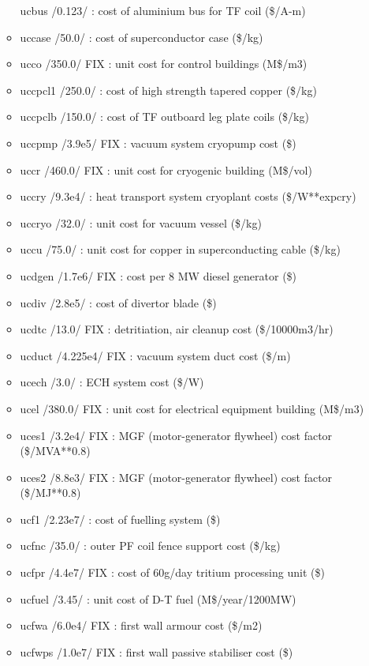 \documentclass[
]{article}
\begin{document}
\begin{itemize}
\begin{itemize}
    ucbus /0.123/ : cost of aluminium bus for TF coil (\$/A-m)
  \item
    uccase /50.0/ : cost of superconductor case (\$/kg)
  \item
    ucco /350.0/ FIX : unit cost for control buildings (M\$/m3)
  \item
    uccpcl1 /250.0/ : cost of high strength tapered copper (\$/kg)
  \item
    uccpclb /150.0/ : cost of TF outboard leg plate coils (\$/kg)
  \item
    uccpmp /3.9e5/ FIX : vacuum system cryopump cost (\$)
  \item
    uccr /460.0/ FIX : unit cost for cryogenic building (M\$/vol)
  \item
    uccry /9.3e4/ : heat transport system cryoplant costs (\$/W**expcry)
  \item
    uccryo /32.0/ : unit cost for vacuum vessel (\$/kg)
  \item
    uccu /75.0/ : unit cost for copper in superconducting cable (\$/kg)
  \item
    ucdgen /1.7e6/ FIX : cost per 8 MW diesel generator (\$)
  \item
    ucdiv /2.8e5/ : cost of divertor blade (\$)
  \item
    ucdtc /13.0/ FIX : detritiation, air cleanup cost (\$/10000m3/hr)
  \item
    ucduct /4.225e4/ FIX : vacuum system duct cost (\$/m)
  \item
    ucech /3.0/ : ECH system cost (\$/W)
  \item
    ucel /380.0/ FIX : unit cost for electrical equipment building
    (M\$/m3)
  \item
    uces1 /3.2e4/ FIX : MGF (motor-generator flywheel) cost factor
    (\$/MVA**0.8)
  \item
    uces2 /8.8e3/ FIX : MGF (motor-generator flywheel) cost factor
    (\$/MJ**0.8)
  \item
    ucf1 /2.23e7/ : cost of fuelling system (\$)
  \item
    ucfnc /35.0/ : outer PF coil fence support cost (\$/kg)
  \item
    ucfpr /4.4e7/ FIX : cost of 60g/day tritium processing unit (\$)
  \item
    ucfuel /3.45/ : unit cost of D-T fuel (M\$/year/1200MW)
  \item
    ucfwa /6.0e4/ FIX : first wall armour cost (\$/m2)
  \item
    ucfwps /1.0e7/ FIX : first wall passive stabiliser cost (\$)

\end{itemize}
\end{itemize}
\end{document}
